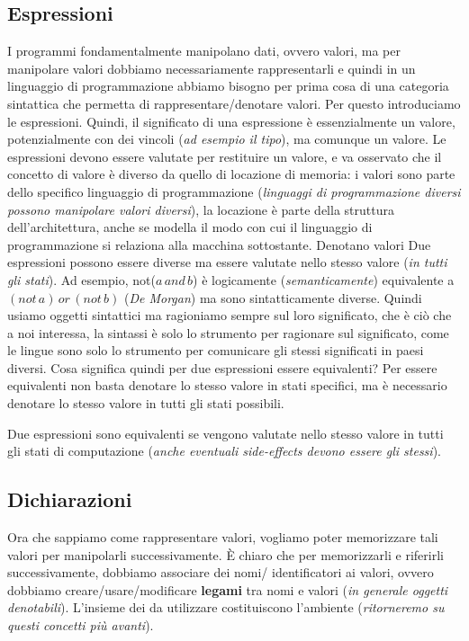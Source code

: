 \documentclass[oneside,a4paper,11pt]{book}
\theoremstyle{italicstyle}
\theoremstyle{normStyle}
\begin{document}
\subsection{Espressioni}
I programmi fondamentalmente manipolano dati, ovvero valori,
ma per manipolare valori dobbiamo necessariamente rappresentarli
e quindi in un linguaggio di programmazione abbiamo bisogno per
prima cosa di una categoria sintattica che permetta di 
rappresentare/denotare valori.
Per questo introduciamo le espressioni. Quindi, il significato
di una espressione è essenzialmente un valore, potenzialmente con
dei vincoli (\textit{ad esempio il tipo}), ma comunque un valore.
Le espressioni devono essere valutate per restituire un valore,
e va osservato che il concetto di valore è diverso da quello di
locazione di memoria: i valori sono parte dello specifico linguaggio
di programmazione (\textit{linguaggi di programmazione diversi possono
manipolare valori diversi}), la locazione è parte della struttura
dell’architettura, anche se modella il modo con cui il linguaggio di
programmazione si relaziona alla macchina sottostante.
Denotano valori Due espressioni possono essere diverse ma essere
valutate nello stesso valore (\textit{in tutti gli stati}).
Ad esempio, not($a\,and\,b$) è logicamente (\textit{semanticamente})
equivalente a $(not\,a)\,or\,(not\,b)$ (\textit{De Morgan})
ma sono sintatticamente diverse. Quindi usiamo oggetti sintattici
ma ragioniamo sempre sul loro significato, che è ciò che a noi
interessa, la sintassi è solo lo strumento per ragionare sul
significato, come le lingue sono solo lo strumento per comunicare
gli stessi significati in paesi diversi.  Cosa significa quindi per
due espressioni essere equivalenti? Per essere equivalenti non basta
denotare lo stesso valore in stati specifici, ma è necessario denotare
lo stesso valore in tutti gli stati possibili.
\begin{tcolorbox}[title={Equivalenza}]
Due espressioni sono equivalenti se vengono valutate nello stesso valore in tutti gli stati di
computazione (\textit{anche eventuali side-effects devono essere gli stessi}).
\end{tcolorbox}
\subsection{Dichiarazioni}
Ora che sappiamo come rappresentare valori, vogliamo poter memorizzare tali valori
per manipolarli successivamente. È chiaro che per memorizzarli e riferirli successivamente,
dobbiamo associare dei nomi/ identificatori ai valori, ovvero dobbiamo creare/usare/modificare
\textbf{legami} tra nomi e valori (\textit{in generale oggetti denotabili}).
L’insieme dei da utilizzare costituiscono l’ambiente
(\textit{ritorneremo su questi concetti più avanti}).
\end{document}
